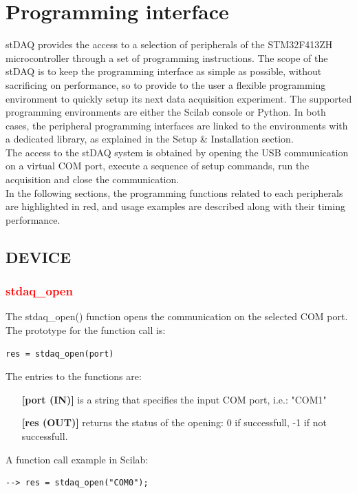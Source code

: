 \documentclass[letterpaper,10pt,english]{hitec}
\begin{document}
\newpage

\section{Programming interface}

stDAQ provides the access to a selection of peripherals of the STM32F413ZH microcontroller through a set of programming instructions. The scope of the stDAQ is to keep the programming interface as simple as possible, without sacrificing on performance, so to provide to the user a flexible programming environment to quickly setup its next data acquisition experiment. The supported programming environments are either the Scilab console or Python. In both cases, the peripheral programming interfaces are linked to the environments with a dedicated library, as explained in the Setup \& Installation section. \\
The access to the stDAQ system is obtained by opening the USB communication on a virtual COM port, execute a sequence of setup commands, run the acquisition and close the communication. \\
In the following sections, the programming functions related to each peripherals are highlighted in red, and usage examples are described along with their timing performance.

\subsection{DEVICE}

\subsubsection{\textcolor{red}{stdaq\_open}}

The stdaq\_open() function opens the communication on the selected COM port. \\
The prototype for the function call is:
\begin{verbatim}
res = stdaq_open(port)
\end{verbatim}
The entries to the functions are:
\begin{itemize}
\item [\textbf{[port (IN)]}] is a string that specifies the input COM port, i.e.: "COM1"
\item [\textbf{[res (OUT)]}] returns the status of the opening: 0 if successfull, -1 if not successfull.
\end{itemize}
A function call example in Scilab:
\begin{verbatim}
--> res = stdaq_open("COM0");
\end{verbatim}
\end{document}
